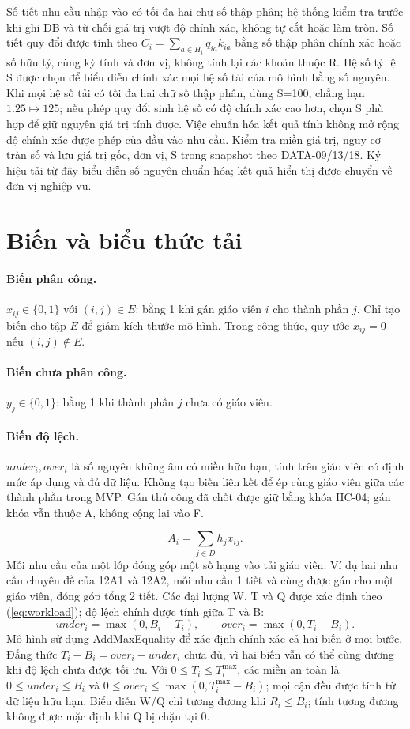 \documentclass[12pt,a4paper]{report}
\begin{document}
Số tiết nhu cầu nhập vào có tối đa hai chữ số thập phân; hệ thống kiểm tra trước khi ghi DB và từ chối giá trị vượt độ chính xác, không tự cắt hoặc làm tròn. Số tiết quy đổi được tính theo $C_i=\sum_{a\in H_i}q_{ia}k_{ia}$ bằng số thập phân chính xác hoặc số hữu tỷ, cùng kỳ tính và đơn vị, không tính lại các khoản thuộc R. Hệ số tỷ lệ S được chọn để biểu diễn chính xác mọi hệ số tải của mô hình bằng số nguyên. Khi mọi hệ số tải có tối đa hai chữ số thập phân, dùng S=100, chẳng hạn $1.25\mapsto125$; nếu phép quy đổi sinh hệ số có độ chính xác cao hơn, chọn S phù hợp để giữ nguyên giá trị tính được. Việc chuẩn hóa kết quả tính không mở rộng độ chính xác được phép của đầu vào nhu cầu. Kiểm tra miền giá trị, nguy cơ tràn số và lưu giá trị gốc, đơn vị, S trong snapshot theo DATA-09/13/18. Ký hiệu tải từ đây biểu diễn số nguyên chuẩn hóa; kết quả hiển thị được chuyển về đơn vị nghiệp vụ.

\section{Biến và biểu thức tải}\label{sec:variables}
\paragraph{Biến phân công.}
$x_{ij}\in\{0,1\}$ với $(i,j)\in E$: bằng 1 khi gán giáo viên $i$ cho thành
phần $j$. Chỉ tạo biến cho tập $E$ để giảm kích thước mô hình. Trong công
thức, quy ước $x_{ij}=0$ nếu $(i,j)\notin E$.
\paragraph{Biến chưa phân công.}
$y_j\in\{0,1\}$: bằng 1 khi thành phần $j$ chưa có giáo viên.
\paragraph{Biến độ lệch.}
$under_i,over_i$ là số nguyên không âm có miền hữu hạn, tính trên giáo viên có định mức áp dụng và đủ dữ liệu. Không tạo biến liên kết để ép cùng giáo viên giữa các thành phần trong MVP. Gán thủ công đã chốt được giữ bằng khóa HC-04; gán khóa vẫn thuộc A, không cộng lại vào F.


\[A_i=\sum_{j\in D}h_jx_{ij}.\]
Mỗi nhu cầu của một lớp đóng góp một số hạng vào tải giáo viên. Ví dụ hai nhu cầu chuyên đề của 12A1 và 12A2, mỗi nhu cầu 1 tiết và cùng được gán cho một giáo viên, đóng góp tổng 2 tiết. Các đại lượng W, T và Q được xác định theo (\ref{eq:workload}); độ lệch chính được tính giữa T và B:
\[
under_i=\max(0,B_i-T_i),\qquad over_i=\max(0,T_i-B_i).
\]
Mô hình sử dụng AddMaxEquality để xác định chính xác cả hai biến ở mọi bước. Đẳng thức $T_i-B_i=over_i-under_i$ chưa đủ, vì hai biến vẫn có thể cùng dương khi độ lệch chưa được tối ưu. Với $0\le T_i\le T_i^{\max}$, các miền an toàn là $0\le under_i\le B_i$ và $0\le over_i\le\max(0,T_i^{\max}-B_i)$; mọi cận đều được tính từ dữ liệu hữu hạn. Biểu diễn W/Q chỉ tương đương khi $R_i\le B_i$; tính tương đương không được mặc định khi Q bị chặn tại 0.
\end{document}
